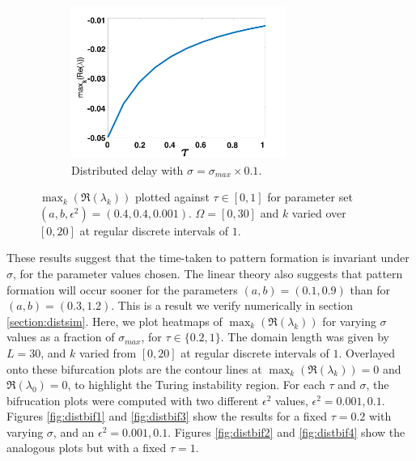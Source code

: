 \documentclass[12pt]{report}
\begin{document}
\begin{figure}[H]
\begin{subfigure}[b]{0.45\textwidth}
        \includegraphics[width=7cm,height=5cm]{p3sigmax10.png}
        \caption{Distributed delay with $\sigma=\sigma_{max}\times0.1$.}
        \label{}
    \end{subfigure}
    \caption{$\max_k(\Re(\lambda_k))$ plotted against $\tau\in[0,1]$ for parameter set $(a,b,\epsilon^2)=(0.4,0.4,0.001)$. $\Omega=[0,30]$ and $k$ varied over $[0,20]$ at regular discrete intervals of $1$.}
    \label{fig:p3}
\end{figure}

These results suggest that the time-taken to pattern formation is invariant under $\sigma$, for the parameter values chosen. The linear theory also suggests that pattern formation will occur sooner for the parameters $(a,b)=(0.1,0.9)$ than for $(a,b)=(0.3,1.2)$. This is a result we verify numerically in section \ref{section:distsim}. Here,  we plot heatmaps of $\max_k(\Re(\lambda_k))$ for varying $\sigma$ values as a fraction of $\sigma_{max}$, for $\tau\in\{0.2,1\}$. The domain length was given by $L=30$, and $k$ varied from $[0,20]$ at regular discrete intervals of $1$. Overlayed onto these bifurcation plots are the contour lines at $\max_k(\Re(\lambda_k))=0$ and $\Re(\lambda_0)=0$, to highlight the Turing instability region. For each $\tau$ and $\sigma$, the bifrucation plots were computed with two different $\epsilon^2$ values, $\epsilon^2=0.001,0.1$. Figures \ref{fig:distbif1} and \ref{fig:distbif3} show the results for a fixed $\tau=0.2$ with varying $\sigma$, and an $\epsilon^2=0.001,0.1$. Figures \ref{fig:distbif2} and \ref{fig:distbif4} show the analogous plots but with a fixed $\tau=1$.
\end{document}
